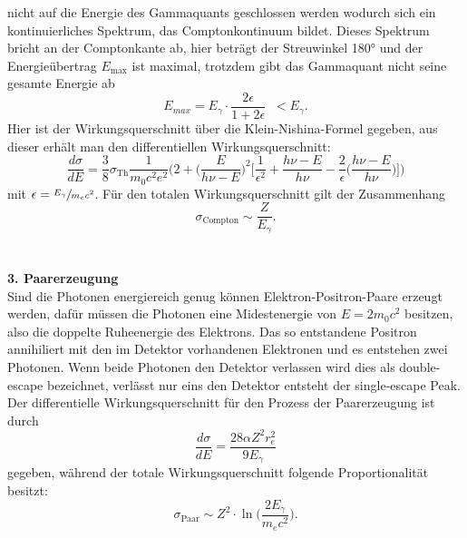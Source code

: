 nicht auf die Energie des Gammaquants geschlossen werden wodurch sich ein kontinuierliches
Spektrum, das Comptonkontinuum bildet. Dieses Spektrum bricht an der Comptonkante ab, hier
beträgt der Streuwinkel 180° und der Energieübertrag $E_{\text{max}}$ ist maximal, trotzdem gibt das
Gammaquant nicht seine gesamte Energie ab
\begin{equation}
  E_{max}=E_{\gamma}\cdot\frac{2\epsilon}{1+2\epsilon}\;\;<E_{\gamma}.
  \label{eqn:kante}
\end{equation}
\cite{Springer3}
Hier ist der Wirkungsquerschnitt über die Klein-Nishina-Formel gegeben, aus dieser erhält man
den differentiellen Wirkungsquerschnitt:
\begin{equation}
  \frac{d\sigma}{dE}=\frac{3}{8}\sigma_{\text{Th}}\frac{1}{m_0 c^2 e^2}\bigg(2+\bigg(\frac{E}{h\nu-E} \bigg)^2 \bigg[\frac{1}{\epsilon^2}+
  \frac{h\nu-E}{h\nu}-\frac{2}{\epsilon}\bigg(\frac{h\nu-E}{h\nu}\bigg) \bigg]\bigg)
  \label{eqn:diffCompton}
\end{equation}
mit $\epsilon=\sfrac{E_{\gamma}}{m_e c^2}$.
Für den totalen Wirkungsquerschnitt gilt der Zusammenhang
\begin{equation}
  \sigma_{\text{Compton}}\sim \frac{Z}{E_{\gamma}}.
  \label{eqn:WPCompton}
\end{equation}
\\
\\
\textbf{3. Paarerzeugung}\\
Sind die Photonen energiereich genug können Elektron-Positron-Paare erzeugt werden, dafür müssen
die Photonen eine Midestenergie von $E=2 m_0 c^2$ besitzen, also die doppelte
Ruheenergie des Elektrons.
Das so entstandene Positron annihiliert mit den im Detektor vorhandenen Elektronen und es
entstehen zwei Photonen. Wenn beide Photonen den Detektor verlassen wird dies als double-escape
bezeichnet, verlässt nur eins den Detektor entsteht der single-escape Peak.
Der differentielle Wirkungsquerschnitt für den Prozess der Paarerzeugung ist durch
\begin{equation}
  \frac{d\sigma}{dE}= \frac{28\alpha Z^2 r_{e}^2}{9E_{\gamma}}
  \label{eqn:diffPaar}
\end{equation}
gegeben, während der totale Wirkungsquerschnitt folgende Proportionalität besitzt:
\begin{equation}
  \sigma_{\text{Paar}}\sim Z^2\cdot\ln\Bigg(\frac{2E_{\gamma}}{m_e c^2}\Bigg).
  \label{eqn:WQPaar}
\end{equation}
\\

